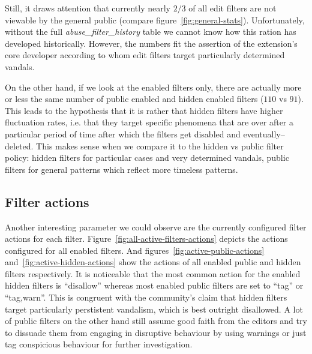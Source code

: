 Still, it draws attention that currently nearly $2/3$ of all edit filters are not viewable by the general public (compare figure~\ref{fig:general-stats}).
Unfortunately, without the full \emph{abuse\_filter\_history} table we cannot know how this ration has developed historically.
However, the numbers fit the assertion of the extension's core developer according to whom edit filters target particularly determined vandals.

On the other hand, if we look at the enabled filters only, there are actually more or less the same number of public enabled and hidden enabled filters ($110$ vs $91$).
This leads to the hypothesis that it is rather that hidden filters have higher fluctuation rates, i.e. that they target specific phenomena that are over after a particular period of time after which the filters get disabled and eventually–deleted.
This makes sense when we compare it to the hidden vs public filter policy: hidden filters for particular cases and very determined vandals, public filters for general patterns which reflect more timeless patterns.


\subsection{Filter actions}

Another interesting parameter we could observe are the currently configured filter actions for each filter.
Figure~\ref{fig:all-active-filters-actions} depicts the actions configured for all enabled filters.
And figures~\ref{fig:active-public-actions} and~\ref{fig:active-hidden-actions} show the actions of all enabled public and hidden filters respectively.
It is noticeable that the most common action for the enabled hidden filters is ``disallow'' whereas most enabled public filters are set to ``tag'' or ``tag,warn''.
This is congruent with the community's claim that hidden filters target particularly perstistent vandalism, which is best outright disallowed.
A lot of public filters on the other hand still assume good faith from the editors and try to dissuade them from engaging in disruptive behaviour by using warnings or just tag conspicious behaviour for further investigation.

